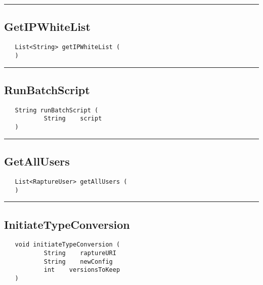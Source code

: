 \rule{15cm}{2pt}
\subsection{GetIPWhiteList}
\label{Api:GetIPWhiteList}
\begin{verbatim}
   List<String> getIPWhiteList (
   )
\end{verbatim}



\rule{15cm}{2pt}
\subsection{RunBatchScript}
\label{Api:RunBatchScript}
\begin{verbatim}
   String runBatchScript (
           String    script
   )
\end{verbatim}



\rule{15cm}{2pt}
\subsection{GetAllUsers}
\label{Api:GetAllUsers}
\begin{verbatim}
   List<RaptureUser> getAllUsers (
   )
\end{verbatim}



\rule{15cm}{2pt}
\subsection{InitiateTypeConversion}
\label{Api:InitiateTypeConversion}
\begin{verbatim}
   void initiateTypeConversion (
           String    raptureURI
           String    newConfig
           int    versionsToKeep
   )
\end{verbatim}



